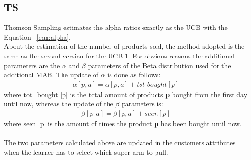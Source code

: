 \subsection{TS}
Thomson Sampling estimates the alpha ratios exactly as the UCB with the Equation ~\ref{eqn:alpha}.\\About the estimation of the number of products sold, the method adopted is the same as the second version for the UCB-1. For obvious reasons the additional parameters are the $\alpha$ and $\beta$ parameters of the Beta distribution used for the additional MAB. The update of $\alpha$ is done as follows:
\begin{align*}
    \alpha[p, a] = \alpha[p, a] + tot\_bought[p]
\end{align*}
where tot\_bought [p] is the total amount of products {\bf p} bought from the first day until now, whereas the update of the $\beta$ parameters is:
\begin{align*}
    \beta[p, a] = \beta [p, a] + seen[p]
\end{align*}
where seen [p] is the amount of times the product {\bf p} has been bought until now.\\\\
The two parameters calculated above are updated in the customers attributes when the learner has to select which super arm to pull.\\

